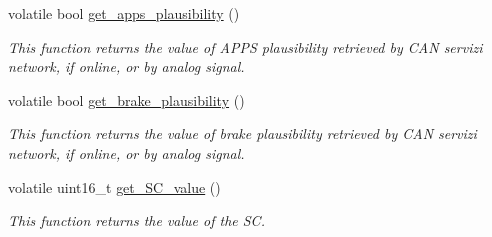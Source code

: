 \begin{DoxyCompactItemize}
volatile bool \mbox{\hyperlink{group___board__model__group_gae0acabf32ee7f2a82b2f9149ba3d1978}{get\+\_\+apps\+\_\+plausibility}} ()
\begin{DoxyCompactList}\small\item\em This function returns the value of A\+P\+PS plausibility retrieved by C\+AN servizi network, if online, or by analog signal. \end{DoxyCompactList}\item 
volatile bool \mbox{\hyperlink{group___board__model__group_gad47b702f79115e19d75b22f39b45efeb}{get\+\_\+brake\+\_\+plausibility}} ()
\begin{DoxyCompactList}\small\item\em This function returns the value of brake plausibility retrieved by C\+AN servizi network, if online, or by analog signal. \end{DoxyCompactList}\item 
volatile uint16\+\_\+t \mbox{\hyperlink{group___board__model__group_ga36eddbc000c8d1820fd2a644a39c87ea}{get\+\_\+\+S\+C\+\_\+value}} ()
\begin{DoxyCompactList}\small\item\em This function returns the value of the SC. \end{DoxyCompactList}\end{DoxyCompactItemize}
